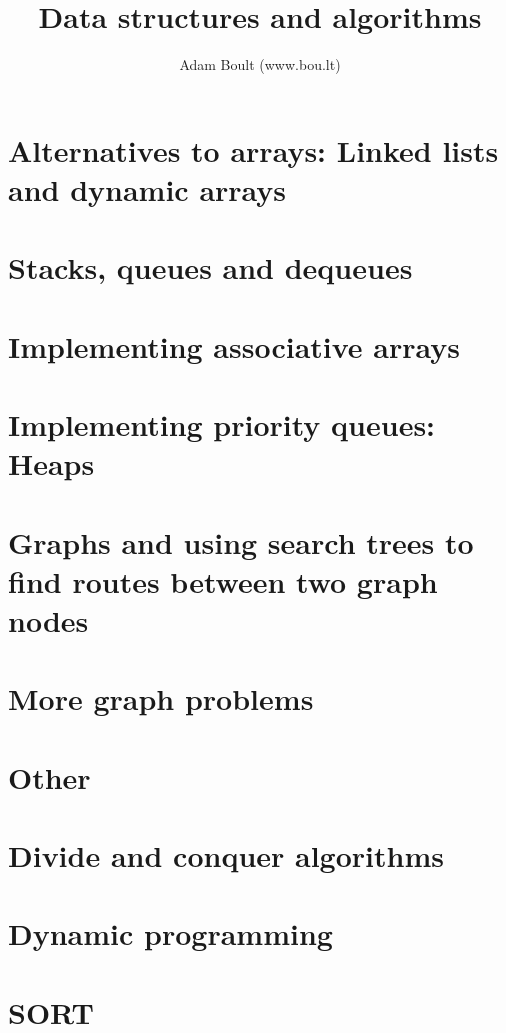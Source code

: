 \documentclass[oneside]{book}
\begin{document}
\author{Adam Boult (www.bou.lt)}
\title{Data structures and algorithms}
\maketitle

\setcounter{tocdepth}{0}
\tableofcontents



\part{Alternatives to arrays: Linked lists and dynamic arrays}







\part{Stacks, queues and dequeues}




\part{Implementing associative arrays}






\part{Implementing priority queues: Heaps}



\part{Graphs and using search trees to find routes between two graph nodes}





\part{More graph problems}




\part{Other}


\part{Divide and conquer algorithms}


\part{Dynamic programming}



\part{SORT}

\end{document}
